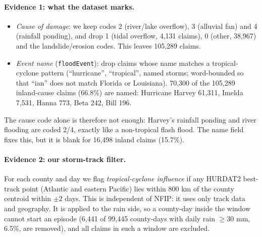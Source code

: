 \documentclass[11pt]{article}
\newcommand{\tc}[1]{\texttt{#1}}
\begin{document}
\paragraph{Evidence 1: what the dataset marks.}
\begin{itemize}
  \item \emph{Cause of damage}: we keep codes 2 (river/lake overflow), 3 (alluvial fan) and 4 (rainfall ponding), and drop 1 (tidal overflow, 4,131 claims), 0 (other, 38,967) and the landslide/erosion codes. This leaves 105,289 claims.
  \item \emph{Event name} (\tc{floodEvent}): drop claims whose name matches a tropical-cyclone pattern (``hurricane'', ``tropical'', named storms; word-bounded so that ``ian'' does not match Florida or Louisiana). 70,300 of the 105,289 inland-cause claims (66.8\%) are named: Hurricane Harvey 61,311, Imelda 7,531, Hanna 773, Beta 242, Bill 196.
\end{itemize}
The cause code alone is therefore not enough: Harvey's rainfall ponding and river flooding are coded 2/4, exactly like a non-tropical flash flood. The name field fixes this, but it is blank for 16,498 inland claims (15.7\%).

\paragraph{Evidence 2: our storm-track filter.}
For each county and day we flag \emph{tropical-cyclone influence} if any HURDAT2 best-track point (Atlantic and eastern Pacific) lies within 800 km of the county centroid within $\pm2$ days. This is independent of NFIP: it uses only track data and geography. It is applied to the rain side, so a county-day inside the window cannot start an episode (6,441 of 99,445 county-days with daily rain $\ge30$ mm, 6.5\%, are removed), and all claims in such a window are excluded.
\end{document}

